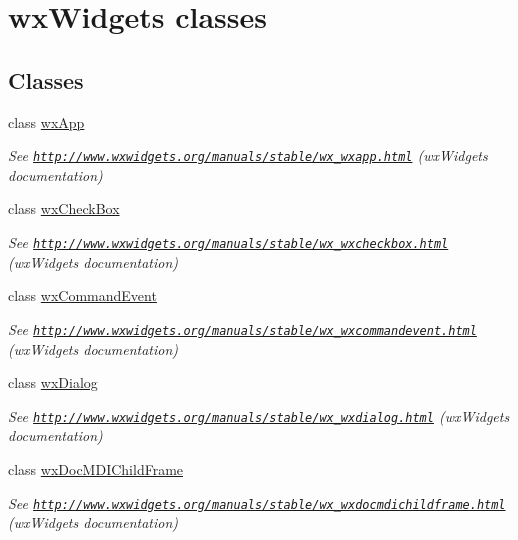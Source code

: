 \hypertarget{group__wxwidgets}{
\section{wxWidgets classes}
\label{group__wxwidgets}
}
\subsection*{Classes}
\begin{DoxyCompactItemize}
\item 
class \hyperlink{classwxApp}{wxApp}
\begin{DoxyCompactList}\small\item\em See \href{http://www.wxwidgets.org/manuals/stable/wx_wxapp.html}{\tt http://www.wxwidgets.org/manuals/stable/wx\_\-wxapp.html} (wxWidgets documentation) \item\end{DoxyCompactList}\item 
class \hyperlink{classwxCheckBox}{wxCheckBox}
\begin{DoxyCompactList}\small\item\em See \href{http://www.wxwidgets.org/manuals/stable/wx_wxcheckbox.html}{\tt http://www.wxwidgets.org/manuals/stable/wx\_\-wxcheckbox.html} (wxWidgets documentation) \item\end{DoxyCompactList}\item 
class \hyperlink{classwxCommandEvent}{wxCommandEvent}
\begin{DoxyCompactList}\small\item\em See \href{http://www.wxwidgets.org/manuals/stable/wx_wxcommandevent.html}{\tt http://www.wxwidgets.org/manuals/stable/wx\_\-wxcommandevent.html} (wxWidgets documentation) \item\end{DoxyCompactList}\item 
class \hyperlink{classwxDialog}{wxDialog}
\begin{DoxyCompactList}\small\item\em See \href{http://www.wxwidgets.org/manuals/stable/wx_wxdialog.html}{\tt http://www.wxwidgets.org/manuals/stable/wx\_\-wxdialog.html} (wxWidgets documentation) \item\end{DoxyCompactList}\item 
class \hyperlink{classwxDocMDIChildFrame}{wxDocMDIChildFrame}
\begin{DoxyCompactList}\small\item\em See \href{http://www.wxwidgets.org/manuals/stable/wx_wxdocmdichildframe.html}{\tt http://www.wxwidgets.org/manuals/stable/wx\_\-wxdocmdichildframe.html} (wxWidgets documentation) \item\end{DoxyCompactList}\item 

\end{DoxyCompactItemize}
